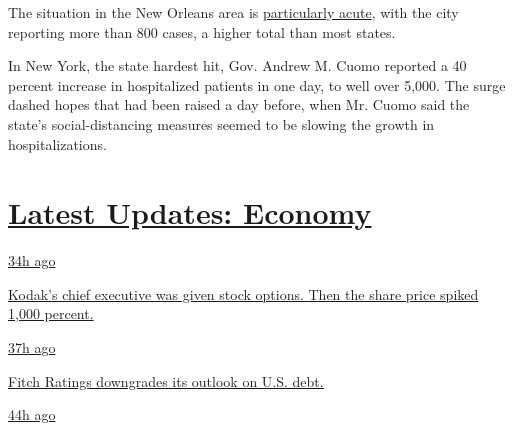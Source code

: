 The situation in the New Orleans area is
\href{https://www.nytimes.com/2020/03/26/us/coronavirus-louisiana-new-orleans.html}{particularly
acute}, with the city reporting more than 800 cases, a higher total than
most states.

In New York, the state hardest hit, Gov. Andrew M. Cuomo reported a 40
percent increase in hospitalized patients in one day, to well over
5,000. The surge dashed hopes that had been raised a day before, when
Mr. Cuomo said the state's social-distancing measures seemed to be
slowing the growth in hospitalizations.

\hypertarget{latest-updates-economy}{%
\section{\texorpdfstring{\href{https://www.nytimes.com/live/2020/07/31/business/stock-market-today-coronavirus?action=click\&pgtype=Article\&state=default\&region=MAIN_CONTENT_1\&context=storylines_live_updates}{Latest
Updates:
Economy}}{Latest Updates: Economy}}\label{latest-updates-economy}}

\href{https://www.nytimes.com/live/2020/07/31/business/stock-market-today-coronavirus?action=click\&pgtype=Article\&state=default\&region=MAIN_CONTENT_1\&context=storylines_live_updates\#kodaks-chief-executive-was-given-stock-options-then-the-share-price-spiked-1000-percent}{34h
ago}

\href{https://www.nytimes.com/live/2020/07/31/business/stock-market-today-coronavirus?action=click\&pgtype=Article\&state=default\&region=MAIN_CONTENT_1\&context=storylines_live_updates\#kodaks-chief-executive-was-given-stock-options-then-the-share-price-spiked-1000-percent}{Kodak's
chief executive was given stock options. Then the share price spiked
1,000 percent.}

\href{https://www.nytimes.com/live/2020/07/31/business/stock-market-today-coronavirus?action=click\&pgtype=Article\&state=default\&region=MAIN_CONTENT_1\&context=storylines_live_updates\#fitch-ratings-downgrades-its-outlook-on-us-debt}{37h
ago}

\href{https://www.nytimes.com/live/2020/07/31/business/stock-market-today-coronavirus?action=click\&pgtype=Article\&state=default\&region=MAIN_CONTENT_1\&context=storylines_live_updates\#fitch-ratings-downgrades-its-outlook-on-us-debt}{Fitch
Ratings downgrades its outlook on U.S. debt.}

\href{https://www.nytimes.com/live/2020/07/31/business/stock-market-today-coronavirus?action=click\&pgtype=Article\&state=default\&region=MAIN_CONTENT_1\&context=storylines_live_updates\#us-sanctions-more-chinese-officials-over-human-rights-violations-as-tensions-flare}{44h
ago}

